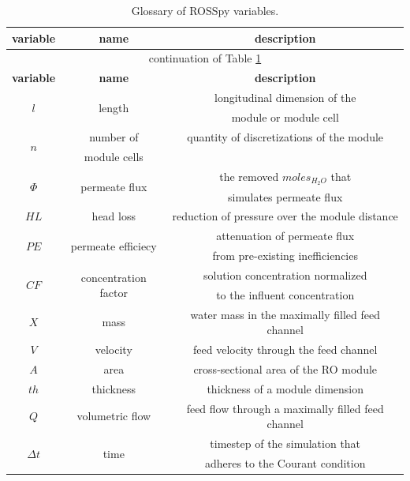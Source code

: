 \begin{longtable}{c|c|c}
    \caption{
        Glossary of ROSSpy variables.  
        \label{glossary} 
    } \\ \toprule
    
    \textbf{variable} & \textbf{name} & \textbf{description} \\ \toprule
    \endfirsthead
    \multicolumn{3}{c}{continuation of Table \ref{glossary}} \\  \toprule
    \textbf{variable} & \textbf{name} & \textbf{description} \\ \toprule
    \endhead
    
    \multirow{2}{1.5em}{$l$} & \multirow{2}{3em}{length} & longitudinal dimension of the\\& & module or module cell \\ \midrule
    \multirow{2}{1.5em}{$n$} & number of & quantity of discretizations of the module \\ & module cells & \\ \midrule
    \multirow{2}{1.5em}{$\Phi$} & \multirow{2}{3em}{permeate flux} & the removed $moles_{H_2O}$ that \\& & simulates permeate flux \\ \midrule  
    $HL$ & head loss & reduction of pressure over the module distance \\ \midrule
    \multirow{2}{2em}{$PE$} & \multirow{2}{3em}{permeate efficiecy} & attenuation of permeate flux \\& & from pre-existing inefficiencies \\ \midrule  
    \multirow{2}{2em}{$CF$} & \multirow{2}{3em}{concentration factor} & solution concentration normalized \\& & to the influent concentration \\ \midrule
    $X$ & mass & water mass in the maximally filled feed channel \\ \midrule
    $V$ & velocity & feed velocity through the feed channel \\ \midrule
    $A$ & area & cross-sectional area of the RO module \\ \midrule
    $th$ & thickness & thickness of a module dimension \\ \midrule
    $Q$ & volumetric flow & feed flow through a maximally filled feed channel \\ \midrule
    \multirow{2}{1.5em}{$\Delta t$} & \multirow{2}{3em}{time} & timestep of the simulation that \\& & adheres to the Courant condition \\ \midrule

\end{longtable}
